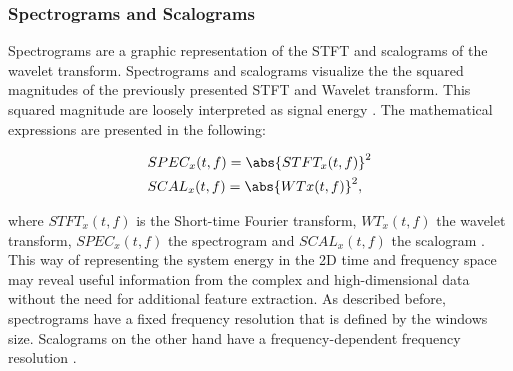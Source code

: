 \subsubsection{Spectrograms and Scalograms}

 Spectrograms are a graphic representation of the STFT and scalograms of the wavelet transform. Spectrograms and scalograms visualize the the squared magnitudes of the previously presented STFT and Wavelet transform. This squared magnitude are loosely interpreted as signal energy \cite{Hlawatsch1992}. The mathematical expressions are presented in the following: 

\begin{equation}
    \begin{aligned}
        &SPEC_{x}(t,f) = \abs{STFT_{x}(t,f)}^{2} \\
        &SCAL_{x}(t,f) = \abs{WT{x}(t,f)}^{2}, 
    \end{aligned}
\end{equation}

where $STFT_{x}(t,f)$ is the Short-time Fourier transform, $WT_{x}(t,f)$ the wavelet transform, $SPEC_{x}(t,f)$ the spectrogram and $SCAL_{x}(t,f)$ the scalogram \cite{Hlawatsch1992}. This way of representing the system energy in the 2D time and frequency space may reveal useful information from the complex and high-dimensional data without the need for additional feature extraction. As described before, spectrograms have a fixed frequency resolution that is defined by the windows size. Scalograms on the other hand have a frequency-dependent frequency resolution \cite{Verstraete2017}.


